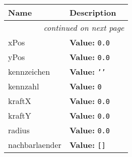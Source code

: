     \vspace{-1cm}
\hspace{\varindent}\begin{longtable}{|p{\varnamewidth}|p{\vardescrwidth}|l}
\cline{1-2}
\cline{1-2} \centering \textbf{Name} & \centering \textbf{Description}& \\
\cline{1-2}
\endhead\cline{1-2}\multicolumn{3}{r}{\small\textit{continued on next page}}\\\endfoot\cline{1-2}
\endlastfoot\raggedright x\-P\-o\-s\- & \raggedright \textbf{Value:} 
{\tt 0.0}&\\
\cline{1-2}
\raggedright y\-P\-o\-s\- & \raggedright \textbf{Value:} 
{\tt 0.0}&\\
\cline{1-2}
\raggedright k\-e\-n\-n\-z\-e\-i\-c\-h\-e\-n\- & \raggedright \textbf{Value:} 
{\tt \texttt{'}\texttt{}\texttt{'}}&\\
\cline{1-2}
\raggedright k\-e\-n\-n\-z\-a\-h\-l\- & \raggedright \textbf{Value:} 
{\tt 0}&\\
\cline{1-2}
\raggedright k\-r\-a\-f\-t\-X\- & \raggedright \textbf{Value:} 
{\tt 0.0}&\\
\cline{1-2}
\raggedright k\-r\-a\-f\-t\-Y\- & \raggedright \textbf{Value:} 
{\tt 0.0}&\\
\cline{1-2}
\raggedright r\-a\-d\-i\-u\-s\- & \raggedright \textbf{Value:} 
{\tt 0.0}&\\
\cline{1-2}
\raggedright n\-a\-c\-h\-b\-a\-r\-l\-a\-e\-n\-d\-e\-r\- & \raggedright \textbf{Value:} 
{\tt \texttt{[}\texttt{]}}&\\
\cline{1-2}
\end{longtable}

